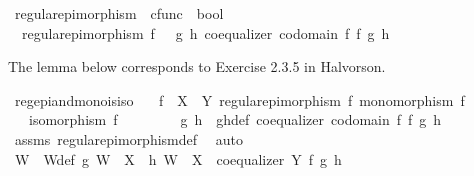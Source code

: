 \begin{isabellebody}
\begin{isamarkuptext}
\end{isamarkuptext}\isamarkuptrue%
\isamarkupfalse%
\ regular{\isacharunderscore}{\kern0pt}epimorphism\ {\isacharcolon}{\kern0pt}{\isacharcolon}{\kern0pt}\ {\isachardoublequoteopen}cfunc\ {\isasymRightarrow}\ bool{\isachardoublequoteclose}\ \isanewline
\ \ {\isachardoublequoteopen}regular{\isacharunderscore}{\kern0pt}epimorphism\ f\ {\isacharequal}{\kern0pt}\ {\isacharparenleft}{\kern0pt}{\isasymexists}\ g\ h{\isachardot}{\kern0pt}\ coequalizer\ {\isacharparenleft}{\kern0pt}codomain\ f{\isacharparenright}{\kern0pt}\ f\ g\ h{\isacharparenright}{\kern0pt}{\isachardoublequoteclose}%
\begin{isamarkuptext}%
The lemma below corresponds to Exercise 2.3.5 in Halvorson.%
\end{isamarkuptext}\isamarkuptrue%
\isamarkupfalse%
\ reg{\isacharunderscore}{\kern0pt}epi{\isacharunderscore}{\kern0pt}and{\isacharunderscore}{\kern0pt}mono{\isacharunderscore}{\kern0pt}is{\isacharunderscore}{\kern0pt}iso{\isacharcolon}{\kern0pt}\isanewline
\ \ \ {\isachardoublequoteopen}f\ {\isacharcolon}{\kern0pt}\ X\ {\isasymrightarrow}\ Y{\isachardoublequoteclose}\ {\isachardoublequoteopen}regular{\isacharunderscore}{\kern0pt}epimorphism\ f{\isachardoublequoteclose}\ {\isachardoublequoteopen}monomorphism\ f{\isachardoublequoteclose}\isanewline
\ \ \ {\isachardoublequoteopen}isomorphism\ f{\isachardoublequoteclose}\isanewline
%
\isadelimproof
%
\endisadelimproof
%
\isatagproof
{}\isamarkupfalse%
\ {\isacharminus}{\kern0pt}\ \ \ \isanewline
\ \ \isamarkupfalse%
\ g\ h\ \ gh{\isacharunderscore}{\kern0pt}def{\isacharcolon}{\kern0pt}\ {\isachardoublequoteopen}coequalizer\ {\isacharparenleft}{\kern0pt}codomain\ f{\isacharparenright}{\kern0pt}\ f\ g\ h{\isachardoublequoteclose}\isanewline
\ \ \ \ \isamarkupfalse%
\ assms{\isacharparenleft}{\kern0pt}{}{\isacharparenright}{\kern0pt}\ regular{\isacharunderscore}{\kern0pt}epimorphism{\isacharunderscore}{\kern0pt}def\ \isamarkupfalse%
\ auto\isanewline
\ \ \isamarkupfalse%
\ W\ \ W{\isacharunderscore}{\kern0pt}def{\isacharcolon}{\kern0pt}\ {\isachardoublequoteopen}{\isacharparenleft}{\kern0pt}g{\isacharcolon}{\kern0pt}\ W\ {\isasymrightarrow}\ X{\isacharparenright}{\kern0pt}\ {\isasymand}\ {\isacharparenleft}{\kern0pt}h{\isacharcolon}{\kern0pt}\ W\ {\isasymrightarrow}\ X{\isacharparenright}{\kern0pt}\ {\isasymand}\ {\isacharparenleft}{\kern0pt}coequalizer\ Y\ f\ g\ h{\isacharparenright}{\kern0pt}{\isachardoublequoteclose}\isanewline

\end{isabellebody}

